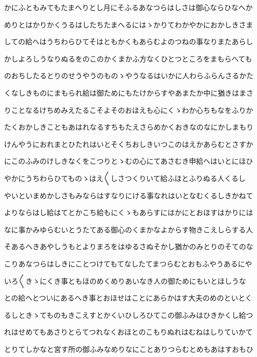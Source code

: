 \documentclass[a4paper,11pt,landscape]{ltjtarticle}
\begin{document}
かにふともみてもたまへりとし月にそふるあなつらはしさは御心ならひなへか
\par\medskip
めりとはかりかくうるはしたちたまへるにはゝかりてわかやかにおかしきさま
\par\medskip
しての給へはうちわらひてそはともかくもあらむよのつねの事なりまたあらし
\par\medskip
かしよろしうなりぬるをのこのかくまかふ方なくひとつところをまもらへても
\par\medskip
のおちしたるとりのせうやうのものゝやうなるはいかに人わらふらんさるかた
\par\medskip
くなしきものにまもられ給は御ためにもたけからすやあまたか中に猶きはまさ
\par\medskip
りことなるけちめみえたるこそよそのおほえも心にくゝわか心ちもなをふりか
\par\medskip
たくおかしきこともあはれなるすちもたえさらめかくおきなのなにかしまもり
\par\medskip
けんやうにおれまとひたれはいとそくちおしきいつこのはえかあらむとさすか
\par\medskip
にこのふみのけしきなくをこつりとゝむの心にてあさむき申給へはいとにほひ
\par\medskip
やかにうちわらひてものゝはえ〱しさつくりいて給ふほとふりぬる人くるし
\par\medskip
やいといまめかしさもみならはすなりにける事なれはいとなむくるしきかねて
\par\medskip
よりならはし給はてとかこち給もにくゝもあらすにはかにとおほすはかりには
\par\medskip
なに事かみゆらむいとうたてある御心のくまかなよからす物きこえしらする人
\par\medskip
そあるへきあやしうもとよりまろをはゆるさぬそかし猶かのみとりのそてのな
\par\medskip
こりあなつらはしきにことつけてもてなしたてまつらむとおもふやうあるにや
\par\medskip
いろ〱きゝにくき事ともほのめくめりあいなき人の御ためにもいとほしうな
\par\medskip
との給へとついにあるへき事とおほせはことにあらかはす大夫のめのといとく
\par\medskip
るしときゝてものもきこえすとかくいひしろひてこの御ふみはひきかくし給つ
\par\medskip
れはせめてもあさりとらてつれなくおほとのこもりぬれはむねはしりていかて
\par\medskip
とりてしかなと宮す所の御ふみなめりなにことありつらむとめもあはすおもひ
\par\medskip
\end{document}
